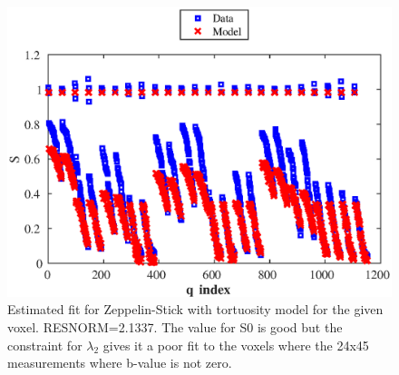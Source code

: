 \documentclass[11pt,a4paper,oneside]{report}
\begin{document}
\begin{figure}[H]
\centering
\includegraphics[scale=0.8]{figures/q3/q132-ZeppStickTort.eps}
\caption{Estimated fit for Zeppelin-Stick with tortuosity model for the given voxel. RESNORM=2.1337. The value for S0 is good but the constraint for $\lambda_2$ gives it a poor fit to the voxels where the 24x45 measurements where b-value is not zero.}
\label{q132-ZeppStickTort}
\end{figure}

\end{document}
